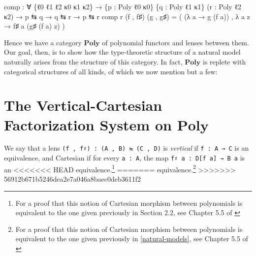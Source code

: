 \documentclass[
  11pt,
  oneside,
  article]{memoir}
\newenvironment{Shaded}{}{}
\newcommand{\NormalTok}[1]{#1}
\newcommand{\OtherTok}[1]{\textcolor[rgb]{0.00,0.44,0.13}{#1}}
\theoremstyle{definition}
\theoremstyle{plain}
\newcommand{\0}{\textsf{0}}
\newcommand{\1}{\tn{\textsf{1}}}
\begin{document}
\begin{Shaded}
\begin{Highlighting}[]
\NormalTok{comp }\OtherTok{:} \OtherTok{∀} \OtherTok{\{}\NormalTok{ℓ0 ℓ1 ℓ2 κ0 κ1 κ2}\OtherTok{\}}
       \OtherTok{→} \OtherTok{\{}\NormalTok{p }\OtherTok{:}\NormalTok{ Poly ℓ0 κ0}\OtherTok{\}} \OtherTok{\{}\NormalTok{q }\OtherTok{:}\NormalTok{ Poly ℓ1 κ1}\OtherTok{\}} \OtherTok{(}\NormalTok{r }\OtherTok{:}\NormalTok{ Poly ℓ2 κ2}\OtherTok{)}
       \OtherTok{→}\NormalTok{ p ⇆ q }\OtherTok{→}\NormalTok{ q ⇆ r }\OtherTok{→}\NormalTok{ p ⇆ r}
\NormalTok{comp r }\OtherTok{(}\NormalTok{f , f♯}\OtherTok{)} \OtherTok{(}\NormalTok{g , g♯}\OtherTok{)} \OtherTok{=} 
     \OtherTok{(} \OtherTok{(λ}\NormalTok{ a }\OtherTok{→}\NormalTok{ g }\OtherTok{(}\NormalTok{f a}\OtherTok{))}\NormalTok{ , }\OtherTok{λ}\NormalTok{ a z }\OtherTok{→}\NormalTok{ f♯ a }\OtherTok{(}\NormalTok{g♯ }\OtherTok{(}\NormalTok{f a}\OtherTok{)}\NormalTok{ z}\OtherTok{)} \OtherTok{)}
\end{Highlighting}
\end{Shaded}

Hence we have a category \(\mathbf{Poly}\) of polynomial functors and
lenses between them. Our goal, then, is to show how the type-theoretic
structure of a natural model naturally arises from the structure of this
category. In fact, \(\mathbf{Poly}\) is replete with categorical
structures of all kinds, of which we now mention but a few:

\section{\texorpdfstring{The Vertical-Cartesian Factorization System on
\(\mathbf{Poly}\)}{The Vertical-Cartesian Factorization System on \textbackslash mathbf\{Poly\}}}\label{the-vertical-cartesian-factorization-system-on-mathbfpoly}

We say that a lens \texttt{(f\ ,\ f♯)\ :\ (A\ ,\ B)\ ⇆\ (C\ ,\ D)} is
\emph{vertical} if \texttt{f\ :\ A\ →\ C} is an equivalence, and
Cartesian if for every \texttt{a\ :\ A}, the map
\texttt{f♯\ a\ :\ D{[}f\ a{]}\ →\ B\ a} is an
<<<<<<< HEAD
equivalence.\footnote{For a proof that this notion of Cartesian morphism between polynomials is equivalent to the one given previously in Section 2.2, see Chapter 5.5 of \cite{niu2024polynomial}}
=======
equivalence.\footnote{For a proof that this notion of Cartesian morphism between polynomials is equivalent to the one given previously in \cref{natural-models}, see Chapter 5.5 of \cite{spivak2022poly}}
>>>>>>> 56912b671b5246dea2e7a046a8baec0deb3611f2
\end{document}
